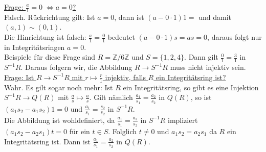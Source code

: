 \documentclass[a4paper, 12pt]{article}
\begin{document}
\underline{Frage: $\frac{a}{1} = 0 \; \Leftrightarrow a = 0$?}\\
Falsch. Rückrichtung gilt: Ist $a = 0$, dann ist $(a-0\cdot 1)1 = $ und damit $(a,1) \sim (0,1)$.\\
Die Hinrichtung ist falsch: $\frac{a}{1} = \frac{0}{1}$ bedeutet $(a-0\cdot 1)s = as = 0$, daraus folgt nur in Integritätsringen $a = 0$.\\
Beispiele für diese Frage sind $R = \mathbb{Z}/6\mathbb{Z}$ und $S = \{1,2,4\}$. Dann gilt $\frac{0}{1} = \frac{3}{1}$ in $S^{-1}R$. Daraus folgern wir, die Abbildung $R \to S^{-1}R$ muss nicht injektiv sein.\\

\underline{Frage: Ist $R \to S^{-1}R$ mit $r \mapsto \frac{r}{1}$ injektiv, falls $R$ ein Integritätsring ist?}\\
Wahr. Es gilt sogar noch mehr: Ist $R$ ein Integritätsring, so gibt es eine Injektion $S^{-1}R \to Q(R)$ mit $\frac{a}{s} \mapsto \frac{a}{s}$. Gilt nämlich $\frac{a_1}{s_1} = \frac{a_2}{s_2}$ in $Q(R)$, so ist $(a_1s_2-a_1s_2)1 = 0$ und $\frac{a_1}{s_1} = \frac{s_2}{s_2}$ in $S^{-1}R$.\\
Die Abbildung ist wohldefiniert, da $\frac{a_1}{s_1} = \frac{a_s}{s_2}$ in $S^{-1}R$ impliziert $(a_1s_2-a_2s_1)t = 0$ für ein $t \in S$. Folglich $t \neq 0$ und $a_1s_2 = a_2s_1$ da $R$ ein Integritätsring ist. Dann ist $\frac{a_1}{s_1} = \frac{a_2}{s_2}$ in $Q(R)$.\\
\end{document}
